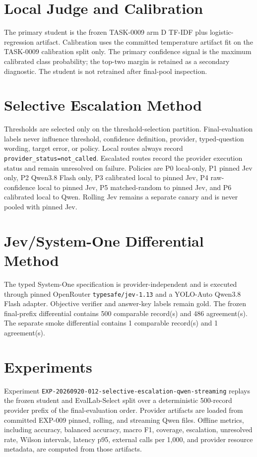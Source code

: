 \documentclass[11pt]{article}
\begin{document}
\section{Local Judge and Calibration}
The primary student is the frozen TASK-0009 arm D TF-IDF plus logistic-regression artifact. Calibration uses the committed temperature artifact fit on the TASK-0009 calibration split only. The primary confidence signal is the maximum calibrated class probability; the top-two margin is retained as a secondary diagnostic. The student is not retrained after final-pool inspection.
\section{Selective Escalation Method}
Thresholds are selected only on the threshold-selection partition. Final-evaluation labels never influence threshold, confidence definition, provider, typed-question wording, target error, or policy. Local routes always record \texttt{provider\_status=not\_called}. Escalated routes record the provider execution status and remain unresolved on failure. Policies are P0 local-only, P1 pinned Jev only, P2 Qwen3.8 Flash only, P3 calibrated local to pinned Jev, P4 raw-confidence local to pinned Jev, P5 matched-random to pinned Jev, and P6 calibrated local to Qwen. Rolling Jev remains a separate canary and is never pooled with pinned Jev.
\section{Jev/System-One Differential Method}
The typed System-One specification is provider-independent and is executed through pinned OpenRouter \texttt{typesafe/jev-1.13} and a YOLO-Auto Qwen3.8 Flash adapter. Objective verifier and answer-key labels remain gold. The frozen final-prefix differential contains 500 comparable record(s) and 486 agreement(s). The separate smoke differential contains 1 comparable record(s) and 1 agreement(s).
\section{Experiments}
Experiment \texttt{EXP-20260920-012-selective-escalation-qwen-streaming} replays the frozen student and EvalLab-Select split over a deterministic 500-record provider prefix of the final-evaluation order. Provider artifacts are loaded from committed EXP-009 pinned, rolling, and streaming Qwen files. Offline metrics, including accuracy, balanced accuracy, macro F1, coverage, escalation, unresolved rate, Wilson intervals, latency p95, external calls per 1,000, and provider resource metadata, are computed from those artifacts.
\end{document}
